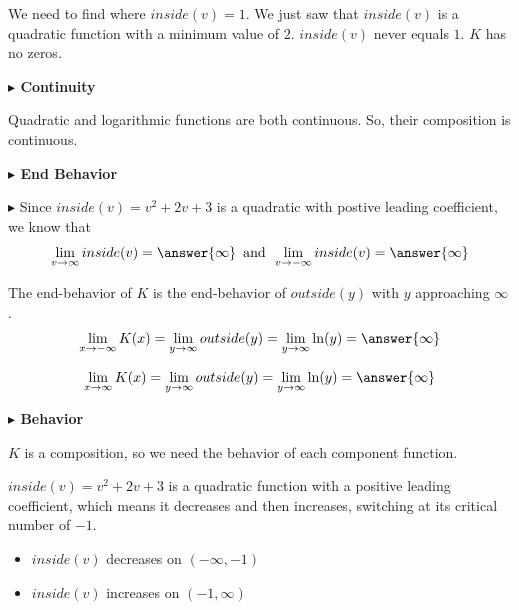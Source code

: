 \documentclass{ximera}
\begin{document}
\begin{example}
We need to find where $inside(v) = 1$. We just saw that $inside(v)$ is a quadratic function with a minimum value of $2$.  $inside(v)$ never equals $1$.  $K$ has no zeros. 






\textbf{\textcolor{blue!55!black}{$\blacktriangleright$ Continuity}} 


Quadratic and logarithmic functions are both continuous. So, their composition is continuous. 




\textbf{\textcolor{blue!55!black}{$\blacktriangleright$ End Behavior}} 






$\blacktriangleright$ Since $inside(v) = v^2 + 2v + 3$ is a quadratic with postive leading coefficient, we know that 
\[  \lim\limits_{v \to \infty}inside(v) = \answer{\infty}  \, \text{ and } \,  \lim\limits_{v \to -\infty}inside(v) = \answer{\infty}  \]


The end-behavior of $K$ is the end-behavior of $outside(y)$ with $y$ approaching $\infty $. \\



\[  
\lim\limits_{x \to -\infty}K(x) =  \lim\limits_{y \to \infty}outside(y) =   \lim\limits_{y \to \infty}\ln(y) =  \answer{\infty}
\]





\[  
\lim\limits_{x \to \infty}K(x) =  \lim\limits_{y \to \infty}outside(y) =   \lim\limits_{y \to \infty}\ln(y) =  \answer{\infty}
\]












\textbf{\textcolor{blue!55!black}{$\blacktriangleright$ Behavior}} 


$K$ is a composition, so we need the behavior of each component function. 




$inside(v) = v^2 + 2v + 3$ is a quadratic function with a positive leading coefficient, which means it decreases and then increases, switching at its critical number of $-1$. 

\begin{itemize}
\item $inside(v)$ decreases on $(-\infty, -1)$ \\
\item $inside(v)$ increases on $(-1, \infty)$ 
\end{itemize}





\end{example}
\end{document}
